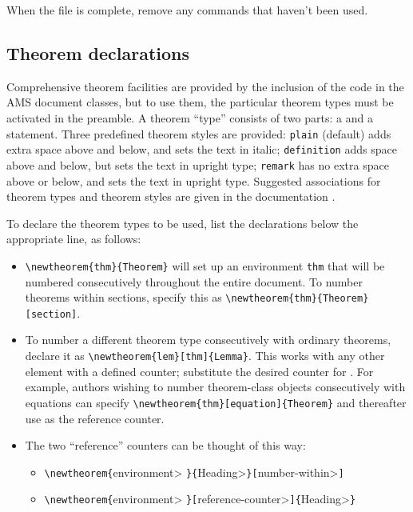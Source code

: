 When the file is complete, remove any commands that haven't been used.  


\subsection{Theorem declarations}\label{ss:thmsetup}

Comprehensive theorem facilities are provided by the inclusion of
the  code in the AMS document classes, but to use them,
the particular theorem types must be activated in the preamble.
A theorem ``type'' consists of two parts: a  and
a  statement.  Three predefined theorem styles are
provided: \verb+plain+ (default) adds extra space above and below,
and sets the text in italic; \verb+definition+ adds space above and
below, but sets the text in upright type; \verb+remark+ has no extra
space above or below, and sets the text in upright type.  Suggested
associations for theorem types and theorem styles are given in the
 documentation \cite{ATH}.

To declare the theorem types to be used, list the declarations
below the appropriate  line, as follows:

\begin{itemize}

\item \verb+\newtheorem{thm}{Theorem}+ will set up an environment
 \verb+thm+ that will be numbered consecutively throughout the
 entire document.  To number theorems within sections, specify
 this as \verb+\newtheorem{thm}{Theorem}[section]+.

\item To number a different theorem type consecutively with
 ordinary theorems, declare it as \verb+\newtheorem{lem}[thm]{Lemma}+.
 This works with any other element with a defined counter; substitute
 the desired counter for .  For example, authors wishing
 to number theorem-class objects consecutively with equations can
 specify \verb+\newtheorem{thm}[equation]{Theorem}+ and thereafter use
  as the reference counter.

\item The two ``reference'' counters can be thought of this way:
 \begin{itemize}
 \item \verb+\newtheorem{+\<environment>%
  \verb+}{+\<Heading>\verb+}[+\<number-within>\verb+]+
 \item \verb+\newtheorem{+\<environment>%
  \verb+}[+\<reference-counter>\verb+]{+\<Heading>\verb+}+
 \end{itemize}

\end{itemize}

